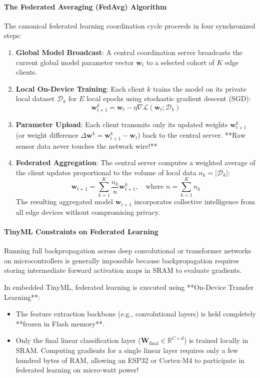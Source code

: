 \paragraph{The Federated Averaging (FedAvg) Algorithm}
The canonical federated learning coordination cycle proceeds in four synchronized steps:
\begin{enumerate}
    \item \textbf{Global Model Broadcast}: A central coordination server broadcasts the current global model parameter vector $\mathbf{w}_t$ to a selected cohort of $K$ edge clients.
    \item \textbf{Local On-Device Training}: Each client $k$ trains the model on its private local dataset $\mathcal{D}_k$ for $E$ local epochs using stochastic gradient descent (SGD):
    \begin{equation}
    \mathbf{w}_{t+1}^k = \mathbf{w}_t - \eta \nabla \mathcal{L}(\mathbf{w}_t; \mathcal{D}_k)\label{eq:local_sgd}
    \end{equation}
    \item \textbf{Parameter Upload}: Each client transmits only its updated weights $\mathbf{w}_{t+1}^k$ (or weight difference $\Delta \mathbf{w}^k = \mathbf{w}_{t+1}^k - \mathbf{w}_t$) back to the central server. **Raw sensor data never touches the network wire!**
    \item \textbf{Federated Aggregation}: The central server computes a weighted average of the client updates proportional to the volume of local data $n_k = |\mathcal{D}_k|$:
    \begin{equation}
    \mathbf{w}_{t+1} = \sum_{k=1}^K \frac{n_k}{n} \mathbf{w}_{t+1}^k, \quad \text{where } n = \sum_{k=1}^K n_k\label{eq:fedavg}
    \end{equation}
    The resulting aggregated model $\mathbf{w}_{t+1}$ incorporates collective intelligence from all edge devices without compromising privacy.
\end{enumerate}

\paragraph{TinyML Constraints on Federated Learning}
Running full backpropagation across deep convolutional or transformer networks on microcontrollers is generally impossible because backpropagation requires storing intermediate forward activation maps in SRAM to evaluate gradients.

In embedded TinyML, federated learning is executed using **On-Device Transfer Learning**:
\begin{itemize}
    \item The feature extraction backbone (e.g., convolutional layers) is held completely **frozen in Flash memory**.
    \item Only the final linear classification layer ($\mathbf{W}_{\text{final}} \in \mathbb{R}^{C \times d}$) is trained locally in SRAM. Computing gradients for a single linear layer requires only a few hundred bytes of RAM, allowing an ESP32 or Cortex-M4 to participate in federated learning on micro-watt power!
\end{itemize}

